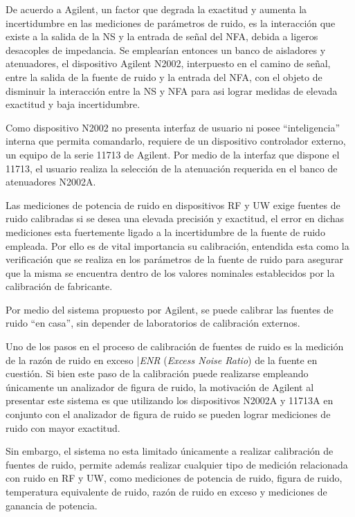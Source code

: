 \documentclass{article}
\begin{document}
	De acuerdo a Agilent, un factor que degrada la exactitud y aumenta la incertidumbre en las mediciones de parámetros de ruido, es la interacción que existe a la salida de la NS y la entrada de señal del NFA, debida a ligeros desacoples de impedancia. Se emplearían entonces un banco de aisladores y atenuadores, el dispositivo Agilent N2002, interpuesto en el camino de señal, entre la salida de la fuente de ruido y la entrada del NFA, con el objeto de disminuir la interacción entre la NS y NFA para asi lograr medidas de elevada exactitud y baja incertidumbre.
	
	Como dispositivo N2002 no presenta interfaz de usuario ni posee “inteligencia” interna que permita comandarlo, requiere de un dispositivo controlador externo, un equipo de la serie 11713 de Agilent. Por medio de la interfaz que dispone el 11713, el usuario realiza la selección de la atenuación requerida en el banco de atenuadores N2002A.
	
	Las mediciones de potencia de ruido en dispositivos RF y UW exige fuentes de ruido calibradas si se desea una elevada precisión y exactitud, el error en dichas mediciones esta fuertemente ligado a la incertidumbre de la fuente de ruido	empleada. Por ello es de vital importancia su calibración, entendida esta como la verificación que se realiza en los	parámetros de la fuente de ruido para asegurar que la misma se encuentra dentro de los valores nominales establecidos	por la calibración de fabricante. 
	
	Por medio del sistema propuesto por Agilent, se puede calibrar las fuentes de ruido “en casa”, sin depender de laboratorios de calibración externos.
	
	Uno de los pasos en el proceso de calibración de fuentes de ruido es la medición de la razón de ruido en exceso |\textit{ENR} (\emph{Excess Noise Ratio}) de la fuente en cuestión. Si bien este paso de la calibración puede realizarse empleando únicamente un analizador de figura de ruido, la motivación de Agilent al presentar este sistema es que utilizando los dispositivos N2002A y 11713A en conjunto con el analizador de figura de ruido se pueden lograr mediciones de ruido con mayor exactitud. 
	
	Sin embargo, el sistema no esta limitado únicamente a realizar calibración de fuentes de ruido, permite además realizar	cualquier tipo de medición relacionada con ruido en RF y UW, como mediciones de potencia de ruido, figura de ruido, temperatura equivalente de ruido, razón de ruido en exceso y mediciones de ganancia de potencia.
	
\end{document}
